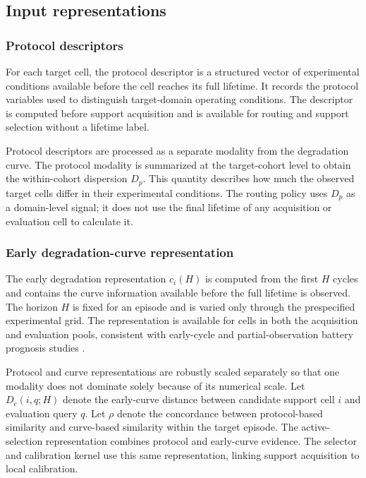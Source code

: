 \documentclass[preprint,12pt]{elsarticle}
\begin{document}
\subsection{Input representations}

\subsubsection{Protocol descriptors}

For each target cell, the protocol descriptor is a structured vector of experimental conditions available before the cell reaches its full lifetime. It records the protocol variables used to distinguish target-domain operating conditions. The descriptor is computed before support acquisition and is available for routing and support selection without a lifetime label.

Protocol descriptors are processed as a separate modality from the degradation curve. The protocol modality is summarized at the target-cohort level to obtain the within-cohort dispersion $D_p$. This quantity describes how much the observed target cells differ in their experimental conditions. The routing policy uses $D_p$ as a domain-level signal; it does not use the final lifetime of any acquisition or evaluation cell to calculate it.

\subsubsection{Early degradation-curve representation}

The early degradation representation $c_i(H)$ is computed from the first $H$ cycles and contains the curve information available before the full lifetime is observed. The horizon $H$ is fixed for an episode and is varied only through the prespecified experimental grid. The representation is available for cells in both the acquisition and evaluation pools, consistent with early-cycle and partial-observation battery prognosis studies \citep{zhu2022capacity,bockrath2023partial,zhao2023est,yang2025ultraearlyjps,yang2025visualized,sudarshan2025degradai,liu2025multimodal,tao2024generative}.

Protocol and curve representations are robustly scaled separately so that one modality does not dominate solely because of its numerical scale. Let $D_c(i,q;H)$ denote the early-curve distance between candidate support cell $i$ and evaluation query $q$. Let $\rho$ denote the concordance between protocol-based similarity and curve-based similarity within the target episode. The active-selection representation combines protocol and early-curve evidence. The selector and calibration kernel use this same representation, linking support acquisition to local calibration.
\end{document}
